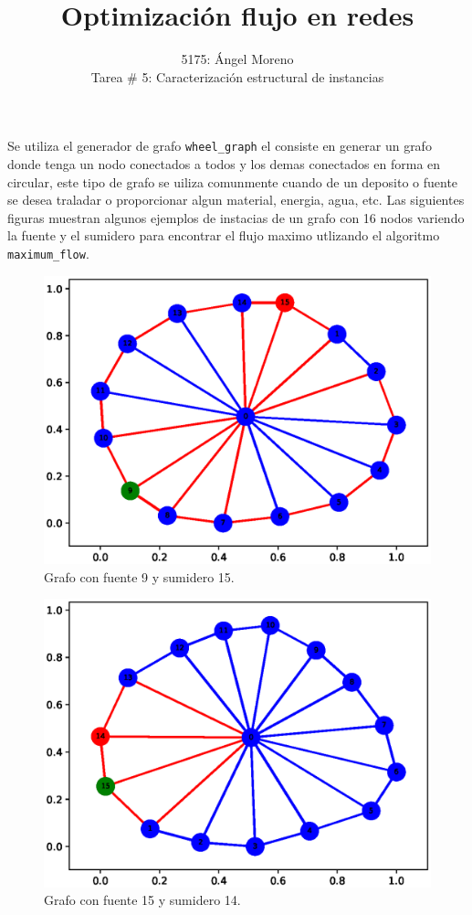 \documentclass[12pt, a4paper]{article}
\author{5175: \'Angel Moreno \\ Tarea \# 5: Caracterización estructural de instancias}
\title{Optimizaci\'on flujo en redes}
\begin{document}
\maketitle

Se utiliza el generador de grafo \texttt{wheel\_graph} el consiste en generar un grafo donde tenga un nodo conectados a todos y los demas conectados en forma en circular, este tipo de grafo se uiliza comunmente cuando de un deposito o fuente se desea traladar o proporcionar algun material, energia, agua, etc. Las siguientes figuras muestran algunos ejemplos de instacias de un grafo con 16 nodos variendo la fuente y el sumidero para encontrar el flujo maximo utlizando el algoritmo \texttt{maximum\_flow}.


\begin{figure} [H] \centering
\includegraphics[scale=0.8]{G1}
\caption{Grafo con fuente 9 y sumidero 15.}
\label{fig: g1}
\end{figure}

\begin{figure} [H] \centering
\includegraphics[scale=0.8]{G2}
\caption{Grafo con fuente 15 y sumidero 14.}
\label{fig: g2}
\end{figure}
\end{document}
